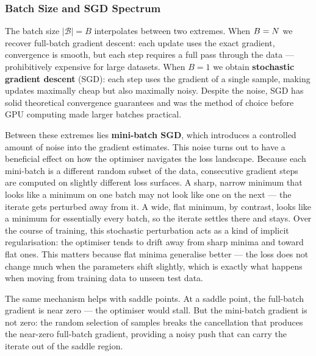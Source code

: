 \subsubsection{Batch Size and SGD Spectrum}

The batch size $|\mathcal{B}| = B$ interpolates between two extremes. When $B = N$ we recover full-batch gradient descent: each update uses the exact gradient, convergence is smooth, but each step requires a full pass through the data — prohibitively expensive for large datasets. When $B = 1$ we obtain \textbf{stochastic gradient descent} (SGD): each step uses the gradient of a single sample, making updates maximally cheap but also maximally noisy. Despite the noise, SGD has solid theoretical convergence guarantees and was the method of choice before GPU computing made larger batches practical.

Between these extremes lies \textbf{mini-batch SGD}, which introduces a controlled amount of noise into the gradient estimates. This noise turns out to have a beneficial effect on how the optimiser navigates the loss landscape. Because each mini-batch is a different random subset of the data, consecutive gradient steps are computed on slightly different loss surfaces. A sharp, narrow minimum that looks like a minimum on one batch may not look like one on the next — the iterate gets perturbed away from it. A wide, flat minimum, by contrast, looks like a minimum for essentially every batch, so the iterate settles there and stays. Over the course of training, this stochastic perturbation acts as a kind of implicit regularisation: the optimiser tends to drift away from sharp minima and toward flat ones. This matters because flat minima generalise better — the loss does not change much when the parameters shift slightly, which is exactly what happens when moving from training data to unseen test data.

The same mechanism helps with saddle points. At a saddle point, the full-batch gradient is near zero — the optimiser would stall. But the mini-batch gradient is not zero: the random selection of samples breaks the cancellation that produces the near-zero full-batch gradient, providing a noisy push that can carry the iterate out of the saddle region.

